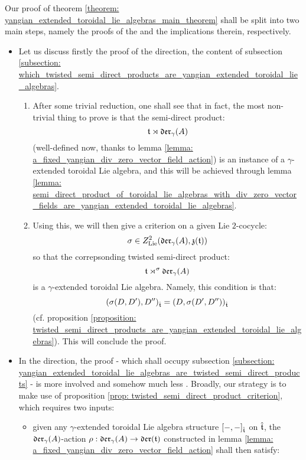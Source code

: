         Our proof of theorem \ref{theorem: yangian_extended_toroidal_lie_algebras_main_theorem} shall be split into two main steps, namely the proofs of the  and the  implications therein, respectively.
        \begin{itemize}
            \item Let us discuss firstly the proof of the  direction, the content of subsection \ref{subsection: which_twisted_semi_direct_products_are_yangian_extended_toroidal_lie_algebras}.
            \begin{enumerate}
                \item After some trivial reduction, one shall see that in fact, the most non-trivial thing to prove is that the semi-direct product:
                    $$\mathfrak{t} \rtimes \mathfrak{der}_{\gamma}(A)$$
                (well-defined now, thanks to lemma \ref{lemma: a_fixed_yangian_div_zero_vector_field_action}) is an instance of a $\gamma$-extended toroidal Lie algebra, and this will be achieved through lemma \ref{lemma: semi_direct_product_of_toroidal_lie_algebras_with_div_zero_vector_fields_are_yangian_extended_toroidal_lie_algebras}. \item Using this, we will then give a criterion on a given Lie $2$-cocycle:
                    $$\sigma \in Z^2_{\mathrm{Lie}}(\mathfrak{der}_{\gamma}(A), \mathfrak{z}(\mathfrak{t}))$$
                so that the correpsonding twisted semi-direct product:
                    $$\mathfrak{t} \rtimes^{\sigma} \mathfrak{der}_{\gamma}(A)$$
                is a $\gamma$-extended toroidal Lie algebra. Namely, this condition is that:
                    $$( \sigma(D, D'), D'' )_{\hat{\mathfrak{t}}} = ( D, \sigma(D', D'') )_{\hat{\mathfrak{t}}}$$
                (cf. proposition \ref{proposition: twisted_semi_direct_products_are_yangian_extended_toroidal_lie_algebras}). This will conclude the proof.
            \end{enumerate}
            \item In the  direction, the proof - which shall occupy subsection \ref{subsection: yangian_extended_toroidal_lie_algebras_are_twisted_semi_direct_products} - is more involved and somehow much less . Broadly, our strategy is to make use of proposition \ref{prop: twisted_semi_direct_product_criterion}, which requires two inputs:
            \begin{itemize}
                \item given any $\gamma$-extended toroidal Lie algebra structure $[-, -]_{\hat{\mathfrak{t}}}$ on $\hat{\mathfrak{t}}$, the $\mathfrak{der}_{\gamma}(A)$-action $\rho: \mathfrak{der}_{\gamma}(A) \to \mathfrak{der}(\mathfrak{t})$ constructed in lemma \ref{lemma: a_fixed_yangian_div_zero_vector_field_action} shall then satisfy:

\end{itemize}
\end{itemize}
